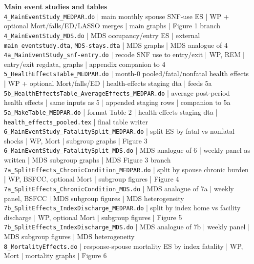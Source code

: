 \documentclass[11pt]{article}
\begin{document}
{\smallskip
\textbf{Main event studies and tables}\\
\nolinkurl{4_MainEventStudy_MEDPAR.do} | main monthly spouse SNF-use ES | WP + optional Mort/falls/ED/LASSO merges | main graphs | Figure 1 branch\\
\nolinkurl{4_MainEventStudy_MDS.do} | MDS occupancy/entry ES | external \nolinkurl{main_eventstudy.dta}, \nolinkurl{MDS-stays.dta} | MDS graphs | MDS analogue of 4\\
\nolinkurl{4a_MainEventStudy_snf-entry.do} | recode SNF use to entry/exit | WP, REM | entry/exit regdata, graphs | appendix companion to 4\\
\nolinkurl{5_HealthEffectsTable_MEDPAR.do} | month-0 pooled/fatal/nonfatal health effects | WP + optional Mort/falls/ED | health-effects staging dta | feeds 5a\\
\nolinkurl{5b_HealthEffectsTable_AverageEffects_MEDPAR.do} | average post-period health effects | same inputs as 5 | appended staging rows | companion to 5a\\
\nolinkurl{5a_MakeTable_MEDPAR.do} | format Table 2 | health-effects staging dta | \nolinkurl{health_effects_pooled.tex} | final table writer\\
\nolinkurl{6_MainEventStudy_FatalitySplit_MEDPAR.do} | split ES by fatal vs nonfatal shocks | WP, Mort | subgroup graphs | Figure 3\\
\nolinkurl{6_MainEventStudy_FatalitySplit_MDS.do} | MDS analogue of 6 | weekly panel as written | MDS subgroup graphs | MDS Figure 3 branch\\
\nolinkurl{7a_SplitEffects_ChronicCondition_MEDPAR.do} | split by spouse chronic burden | WP, BSFCC, optional Mort | subgroup figures | Figure 4\\
\nolinkurl{7a_SplitEffects_ChronicCondition_MDS.do} | MDS analogue of 7a | weekly panel, BSFCC | MDS subgroup figures | MDS heterogeneity\\
\nolinkurl{7b_SplitEffects_IndexDischarge_MEDPAR.do} | split by index home vs facility discharge | WP, optional Mort | subgroup figures | Figure 5\\
\nolinkurl{7b_SplitEffects_IndexDischarge_MDS.do} | MDS analogue of 7b | weekly panel | MDS subgroup figures | MDS heterogeneity\\
\nolinkurl{8_MortalityEffects.do} | response-spouse mortality ES by index fatality | WP, Mort | mortality graphs | Figure 6\\

}
\end{document}
